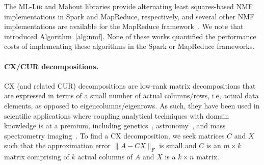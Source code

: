 The \textsc{ML-Lib} and Mahout libraries provide alternating least squares-based NMF implementations in Spark and MapReduce, respectively, and several other NMF implementations are available for the MapReduce framework~\cite{liu2010distributed,Liao201448,benson2014scalable}. We note that~\cite{benson2014scalable} introduced Algorithm~\ref{alg:nmf}. None of these works quantified the performance costs of implementing these algorithms in the Spark or MapReduce frameworks.

\paragraph{CX/CUR decompositions.}
CX (and related CUR) decompositions are
low-rank matrix decompositions that are expressed in terms of a small number of actual columns/rows, i.e, actual data elements, as opposed to eigencolumns/eigenrows.  
As such, they have been used in scientific applications where coupling analytical techniques with domain knowledge is at a premium, including
genetics~\cite{Paschou07b}, astronomy~\cite{Yip14-AJ}, and mass spectrometry imaging~\cite{YRPMB15}. To find a CX decomposition, we seek matrices $C$ and $X$ such that the approximation error $\|A-CX\|_F$ is small and $C$ is an $m\times k$ matrix comprising of $k$
actual columns of $A$ and $X$ is a $k \times n$ matrix.


